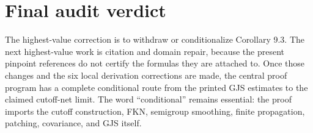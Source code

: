 \documentclass[10pt,a4paper]{article}
\begin{document}
\section{Final audit verdict}

The highest-value correction is to withdraw or conditionalize Corollary 9.3.  The next
highest-value work is citation and domain repair, because the present pinpoint references
do not certify the formulas they are attached to.  Once those changes and the six local
derivation corrections are made, the central proof program has a complete conditional
route from the printed GJS estimates to the claimed cutoff-net limit.  The word
``conditional'' remains essential: the proof imports the cutoff construction, FKN,
semigroup smoothing, finite propagation, patching, covariance, and GJS itself.
\end{document}
